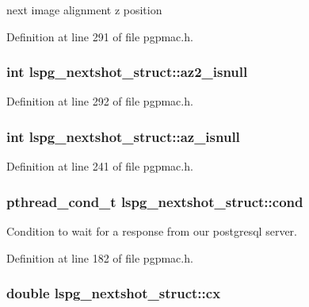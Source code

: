 next image alignment z position 



Definition at line 291 of file pgpmac.\-h.

\hypertarget{structlspg__nextshot__struct_a95d080f13a4e02b9aa883821ee3e721c}{
\subsubsection[{az2\-\_\-isnull}]{\setlength{\rightskip}{0pt plus 5cm}int lspg\-\_\-nextshot\-\_\-struct\-::az2\-\_\-isnull}}\label{structlspg__nextshot__struct_a95d080f13a4e02b9aa883821ee3e721c}


Definition at line 292 of file pgpmac.\-h.

\hypertarget{structlspg__nextshot__struct_aaebd6d432810313294b5fed5f4445cb1}{
\subsubsection[{az\-\_\-isnull}]{\setlength{\rightskip}{0pt plus 5cm}int lspg\-\_\-nextshot\-\_\-struct\-::az\-\_\-isnull}}\label{structlspg__nextshot__struct_aaebd6d432810313294b5fed5f4445cb1}


Definition at line 241 of file pgpmac.\-h.

\hypertarget{structlspg__nextshot__struct_afc773a9eefc173aa98d5c2889e1d7669}{
\subsubsection[{cond}]{\setlength{\rightskip}{0pt plus 5cm}pthread\-\_\-cond\-\_\-t lspg\-\_\-nextshot\-\_\-struct\-::cond}}\label{structlspg__nextshot__struct_afc773a9eefc173aa98d5c2889e1d7669}


Condition to wait for a response from our postgresql server. 



Definition at line 182 of file pgpmac.\-h.

\hypertarget{structlspg__nextshot__struct_ad9eb2013fa6f295f72f0891fe98c863f}{
\subsubsection[{cx}]{\setlength{\rightskip}{0pt plus 5cm}double lspg\-\_\-nextshot\-\_\-struct\-::cx}}\label{structlspg__nextshot__struct_ad9eb2013fa6f295f72f0891fe98c863f}


